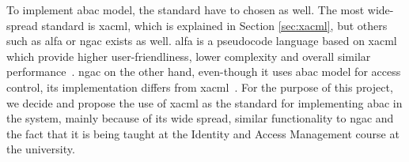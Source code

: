To implement \acrshort{abac} model, the standard have to chosen as well. The most wide-spread standard is \acrshort{xacml}, which is explained in Section \ref{sec:xacml}, but others such as \acrfull{alfa} or \acrfull{ngac} exists as well. \acrshort{alfa} is a pseudocode language based on \acrshort{xacml} which provide higher user-friendliness, lower complexity and overall similar performance~\cite{Mejri2016FormalPolicies}. \acrshort{ngac} on the other hand, even-though it uses \acrshort{abac} model for access control, its implementation differs from \acrshort{xacml}~\cite{Ferraiolo2016ANGAC}. For the purpose of this project, we decide and propose the use of \acrshort{xacml} as the standard for implementing \acrshort{abac} in the system, mainly because of its wide spread, similar functionality to \acrshort{ngac} and the fact that it is being taught at the Identity and Access Management course at the university.

